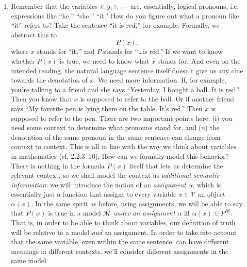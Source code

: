 \begin{enumerate}[\thesection.1]
	\item Remember that the variables $x,y,z,\mathellipsis$ are, essentially, logical pronouns, i.e. expressions like ``he,'' ``she,'' ``it.'' How do you figure out what a pronoun like ``it'' refers to? Take the sentence ``it is red,'' for example. Formally, we abstract this to \[P(x),\] where $x$ stands for ``it,'' and $P$ stands for ``\dots is red.'' If we want to know whether $P(x)$ is true, we need to know what $x$ stands for. And even on the intended reading, the natural language sentence itself doesn't give us any clue towards the denotation of $x$. We need more information. If, for example, you're talking to a friend and she says ``Yesterday, I bought a ball. It is red.'' Then you know that $x$ is supposed to refer to the ball. Or if another friend says ``My favorite pen is lying there on the table. It's red.'' Then $x$ is supposed to refer to the pen. There are two important points here: (i) you need some context to determine what pronouns stand for, and (ii) the denotation of the same pronoun in the same sentence can change from context to context. This is all in line with the way we think about variables in mathematics (cf.  2.2.3--10). How can we formally model this behavior? There is nothing in the formula $P(x)$ itself that lets us determine the relevant context, so we shall model the context as \emph{additional semantic information}: we will introduce the notion of an \emph{assignment} $\alpha$, which is essentially just a function that assigns to every variable $x\in\mathcal{V}$ an object $\alpha(x)$. In the same spirit as before, using assignments, we will be able to say that $P(x)$ is true in a model $\mathcal{M}$ \emph{under an assignment} $\alpha$ iff $\alpha(x)\in P^\mathcal{M}$. That is, in order to be able to think about variables, our definition of truth will be relative to a model \emph{and} an assignment. In order to take into account that the same variable, even within the same sentence, can have different meanings in different contexts, we'll consider different assignments in the same model. 
	

\end{enumerate}
